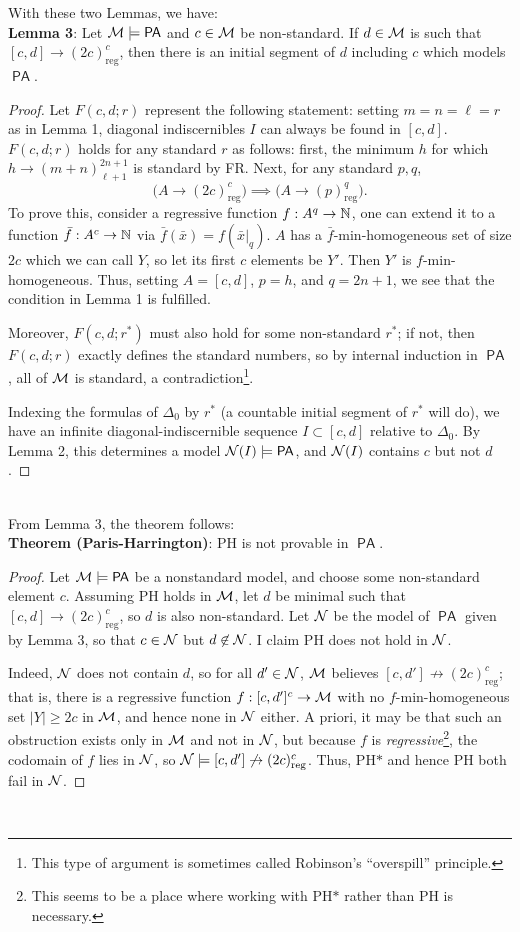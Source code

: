 \documentclass{amsart}
\DeclareMathOperator{\PA}{\mathsf{PA}}
\begin{document}
	With these two Lemmas, we have:\\
	
	\noindent \textbf{Lemma 3}: Let $\M\models \PA$ and $c\in \mathcal{M}$ be non-standard. If $d\in \mathcal{M}$ is such that $[c,d]\to (2c)^c_{\text{reg}}$, then there is an initial segment of $d$ including $c$ which models $\PA$.
	\begin{proof}
		Let $F(c,d;r)$ represent the following statement: setting $m=n=\ell=r$ as in Lemma 1, diagonal indiscernibles $I$ can always be found in $[c,d]$. $F(c,d;r)$ holds for any standard $r$ as follows: first, the minimum $h$ for which $h\to (m+n)^{2n+1}_{\ell+1}$ is standard by FR. Next, for any standard $p,q$,
		$$\Big(A\to (2c)^c_{\text{reg}}\Big) \implies \Big(A\to (p)^{q}_{\text{reg}}\Big).$$
		To prove this, consider a regressive function $f:A^q\to \mathbb{N}$, one can extend it to a function $\bar{f}:A^{c}\to \mathbb{N}$ via $\bar{f}(\bar{x})=f(\bar{x}|_q)$. $A$ has a $\bar{f}$-min-homogeneous set of size $2c$ which we can call $Y$, so let its first $c$ elements be $Y'$. Then $Y'$ is $f$-min-homogeneous. Thus, setting $A=[c,d]$, $p=h$, and $q=2n+1$, we see that the condition in Lemma 1 is fulfilled.
		
		Moreover, $F(c,d;r^*)$ must also hold for some non-standard $r^*$; if not, then $F(c,d;r)$ exactly defines the standard numbers, so by internal induction in $\PA$, all of $\mathcal{M}$ is standard, a contradiction\footnote{This type of argument is sometimes called Robinson's ``overspill'' principle.}.
		
		Indexing the formulas of $\Delta_0$ by $r^*$ (a countable initial segment of $r^*$ will do), we have an infinite diagonal-indiscernible sequence $I\subset [c,d]$ relative to $\Delta_0$. By Lemma 2, this determines a model $\NN(I)\models \PA$, and $\mathcal{N}(I)$ contains $c$ but not $d$.
	\end{proof}\\
	
	From Lemma 3, the theorem follows:\\
	
	\noindent \textbf{Theorem (Paris-Harrington)}: PH is not provable in $\PA$.
	\begin{proof}
		Let $\M\models \PA$ be a nonstandard model, and choose some non-standard element $c$. Assuming PH holds in $\mathcal{M}$, let $d$ be minimal such that $[c,d]\to (2c)^c_{\text{reg}}$, so $d$ is also non-standard. Let $\mathcal{N}$ be the model of $\PA$ given by Lemma 3, so that $c\in\mathcal{N}$ but $d\not\in \mathcal{N}$. I claim PH does not hold in $\mathcal{N}$.
		
		Indeed, $\mathcal{N}$ does not contain $d$, so for all $d'\in \mathcal{N}$, $\mathcal{M}$ believes $[c,d']\not\to (2c)^c_{\text{reg}}$; that is, there is a regressive function $f:[c,d']^c\to \mathcal{M}$ with no $f$-min-homogeneous set $|Y|\geq 2c$ in $\mathcal{M}$, and hence none in $\mathcal{N}$ either. A priori, it may be that such an obstruction exists only in $\mathcal{M}$ and not in $\mathcal{N}$, but because $f$ is \textit{regressive}\footnote{This seems to be a place where working with PH$\ast$ rather than PH is necessary.}, the codomain of $f$ lies in $\mathcal{N}$, so $\mathcal{N}\models [c,d']\not\to (2c)^c_{\text{reg}}$. Thus, PH$\ast$ and hence PH both fail in $\mathcal{N}$.
	\end{proof}\\
	
\end{document}
